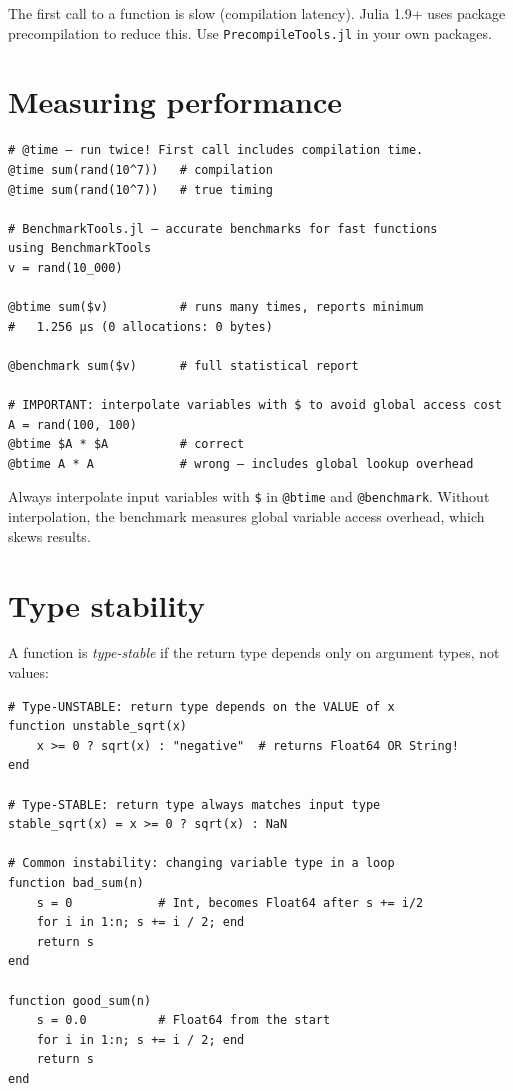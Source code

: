 \begin{juliatip}
The first call to a function is slow (compilation latency). Julia 1.9+ uses package precompilation to reduce this. Use \texttt{PrecompileTools.jl} in your own packages.
\end{juliatip}

\section{Measuring performance}

\begin{verbatim}
# @time — run twice! First call includes compilation time.
@time sum(rand(10^7))   # compilation
@time sum(rand(10^7))   # true timing

# BenchmarkTools.jl — accurate benchmarks for fast functions
using BenchmarkTools
v = rand(10_000)

@btime sum($v)          # runs many times, reports minimum
#   1.256 μs (0 allocations: 0 bytes)

@benchmark sum($v)      # full statistical report

# IMPORTANT: interpolate variables with $ to avoid global access cost
A = rand(100, 100)
@btime $A * $A          # correct
@btime A * A            # wrong — includes global lookup overhead
\end{verbatim}

\begin{warningbox}
Always interpolate input variables with \texttt{\$} in \texttt{@btime} and \texttt{@benchmark}. Without interpolation, the benchmark measures global variable access overhead, which skews results.
\end{warningbox}

\section{Type stability}

A function is \emph{type-stable} if the return type depends only on argument types, not values:

\begin{verbatim}
# Type-UNSTABLE: return type depends on the VALUE of x
function unstable_sqrt(x)
    x >= 0 ? sqrt(x) : "negative"  # returns Float64 OR String!
end

# Type-STABLE: return type always matches input type
stable_sqrt(x) = x >= 0 ? sqrt(x) : NaN

# Common instability: changing variable type in a loop
function bad_sum(n)
    s = 0            # Int, becomes Float64 after s += i/2
    for i in 1:n; s += i / 2; end
    return s
end

function good_sum(n)
    s = 0.0          # Float64 from the start
    for i in 1:n; s += i / 2; end
    return s
end
\end{verbatim}

